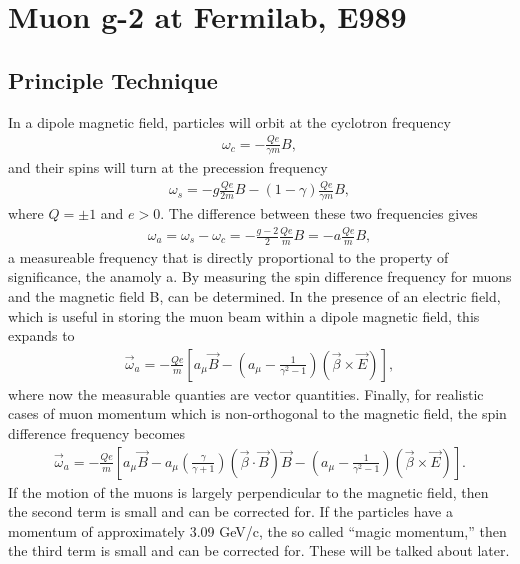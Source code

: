 \graphicspath{ {Body/Figures/ExperimentalOverview/Decay/} {Body/Figures/TrackingFigures/TrackerPics/} }
\thispagestyle{myheadings} %

\chapter{Muon g-2 at Fermilab, E989}
\label{chapter:Muon g-2 at Fermilab, E989}

\section{Principle Technique}
\label{sec:PrincipleTechnique}

In a dipole magnetic field, particles will orbit at the cyclotron frequency 
        \begin{align} \label{eq:wc}
        	\omega_{c} = -\frac{Qe}{\gamma m}B,
        \end{align}
and their spins will turn at the precession frequency
        \begin{align} \label{eq:ws}
        	\omega_{s} = -g\frac{Qe}{2m}B - (1-\gamma)\frac{Qe}{\gamma m}B,
        \end{align}
where $Q = \pm 1$ and $e > 0$. The difference between these two frequencies gives
        \begin{align} \label{eq:wasimple}
        	\omega_{a} = \omega_{s} - \omega_{c} = -\frac{g-2}{2}\frac{Qe}{m}B = - a \frac{Qe}{m}B,
        \end{align}
a measureable frequency that is directly proportional to the property of significance, the anamoly a. By measuring the spin difference frequency for muons and the magnetic field B, \amu can be determined. In the presence of an electric field, which is useful in storing the muon beam within a dipole magnetic field, this expands to 
        \begin{align} \label{eq:waelectric}
            \vec{\omega}_{a} = -\frac{Qe}{m} [a_{\mu}\vec{B} - (a_{\mu} - \frac{1}{\gamma^{2}-1})(\vec{\beta} \times \vec{E}) ],
        \end{align}
where now the measurable quanties are vector quantities. Finally, for realistic cases of muon momentum which is non-orthogonal to the magnetic field, the spin difference frequency becomes
        \begin{align} \label{eq:wafinal}
            \vec{\omega}_{a} = -\frac{Qe}{m} [a_{\mu}\vec{B} - a_{\mu} (\frac{\gamma}{\gamma+1})(\vec{\beta} \cdot \vec{B})\vec{B} - (a_{\mu} - \frac{1}{\gamma^{2}-1})(\vec{\beta} \times \vec{E}) ].
        \end{align}
If the motion of the muons is largely perpendicular to the magnetic field, then the second term is small and can be corrected for. If the particles have a momentum of approximately 3.09 GeV/c, the so called ``magic momentum,'' then the third term is small and can be corrected for. These will be talked about later.

